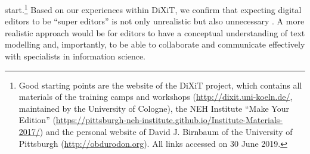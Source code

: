 \begin{paper}
start.\footnote{Good starting points are the website of the DiXiT
  project, which contains all materials of the training camps and
  workshops
  (\href{http://dixit.uni-koeln.de/}{{http://dixit.uni-koeln.de/}},
  maintained by the University of Cologne), the NEH Institute ``Make Your
  Edition''
  (\href{https://pittsburgh-neh-institute.github.io/Institute-Materials-2017/}{{https://pittsburgh-neh-institute.github.io/Institute-Materials-2017/}})
  and the personal website of David J. Birnbaum of the University of
  Pittsburgh (\href{http://obdurodon.org/}{{http://obdurodon.org}}). All
  links accessed on 30 June 2019.} Based on our experiences within
DiXiT, we confirm that expecting digital editors to be ``super editors''
is not only unrealistic but also unnecessary \citep{pierazzo_digital_2016}. A more
realistic approach would be for editors to have a conceptual
understanding of text modelling and, importantly, to be able to
collaborate and communicate effectively with specialists in information
science.


\end{paper}
